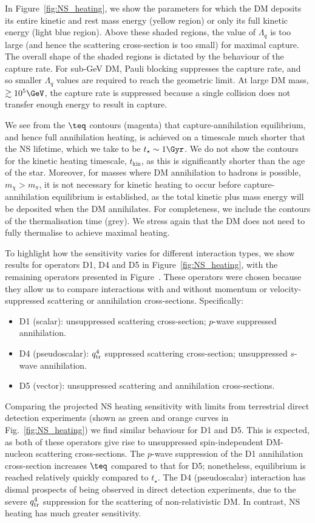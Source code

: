 In Figure~\ref{fig:NS_heating}, we show the parameters for which the DM deposits its entire kinetic and rest mass energy (yellow region) or only its full kinetic energy (light blue region).  Above these shaded regions, the value of $\Lambda_q$ is too large (and hence the scattering cross-section is too small) for maximal capture.
The overall shape of the shaded regions is dictated by the behaviour of the capture rate. For sub-GeV DM, Pauli blocking suppresses the capture rate, and so smaller $\Lambda_q$ values are required to reach the geometric limit. At large DM mass, $\gtrsim 10^5\GeV$, the capture rate is suppressed because a single collision does not transfer enough energy to result in capture.


We see from the $\teq$ contours (magenta) that capture-annihilation equilibrium, and hence full annihilation heating, is achieved on a timescale much shorter that the NS lifetime, which we take to be $t_\star\sim 1\Gyr$. 
We do not show the contours for the kinetic heating timescale, $t_\mathrm{kin}$, as this is significantly shorter than the age of the star.  Moreover, for masses where DM annihilation to hadrons is possible, $m_\chi>m_\pi$, it is not necessary for kinetic heating to occur before capture-annihilation equilibrium is established, as the total kinetic plus mass energy will be deposited when the DM annihilates. 
For completeness, we include the contours of the thermalisation time (grey). We stress again that the DM does not need to fully thermalise to achieve maximal heating.


To highlight how the sensitivity varies for different interaction types, we show results for operators D1, D4 and D5 in Figure~\ref{fig:NS_heating}, with the remaining operators presented in Figure~. These operators were chosen because they allow us to compare interactions with and without momentum or velocity-suppressed scattering or annihilation cross-sections. Specifically: 
\begin{itemize}
\item D1 (scalar): unsuppressed scattering cross-section; $p$-wave suppressed annihilation.
\item D4 (pseudoscalar): $q_{\rm tr}^4$ suppressed scattering cross-section; unsuppressed $s$-wave annihilation.
\item D5 (vector): unsuppressed scattering and annihilation cross-sections.
\end{itemize}

Comparing the projected NS heating sensitivity with limits from terrestrial direct detection experiments (shown as green and orange curves in Fig.~\ref{fig:NS_heating}) we find similar behaviour for D1 and D5. This is expected, as both of these operators give rise to unsuppressed spin-independent DM-nucleon scattering cross-sections. The $p$-wave suppression of the D1 annihilation cross-section increases $\teq$ compared to that for D5; nonetheless, equilibrium is reached relatively quickly compared to $t_\star$.  The D4 (pseudoscalar) interaction has dismal prospects of being observed in direct detection experiments, due to the severe  $q_{\rm tr}^4$ suppression for the scattering of non-relativistic DM. In contrast, NS heating has much greater sensitivity.

